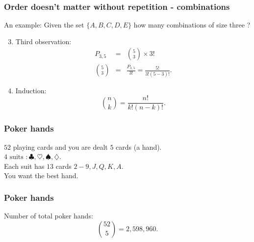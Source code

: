 \begin{frame}[fragile]\frametitle{Order doesn't matter without repetition - combinations}

An example: Given the set $\{A,B,C,D,E\}$ how many combinations of
size three ?  

\vspace{.1in}

\begin{enumerate}
\setcounter{enumi}{2}

\item Third observation: 
\begin{eqnarray*}
P_{3,5}& = & \binom{5}{3} \times 3! \\
\binom{5}{3} &=&\frac{P_{3,5}}{3!}=  \frac{5!}{3!(5-3)!}. 
\end{eqnarray*}

\item Induction:  
$$\binom{n}{k} = \frac{n!}{k!(n-k)!}.$$

\end{enumerate}
\end{frame}

\begin{frame}[fragile]\frametitle{Poker hands}

$52$ playing cards and you are dealt $5$ cards (a hand). \\ 
$4 \mbox{ suits }: \clubsuit, \heartsuit, \spadesuit,
\diamondsuit$. \\ 
Each suit has $13$ cards $2-9,J,Q,K,A$. \\ 
You want the best hand. \\
\end{frame}


\begin{frame}[fragile]\frametitle{Poker hands}


Number of total poker hands:
$$\binom{52}{5} = 2,598,960.$$ 
\end{frame}


